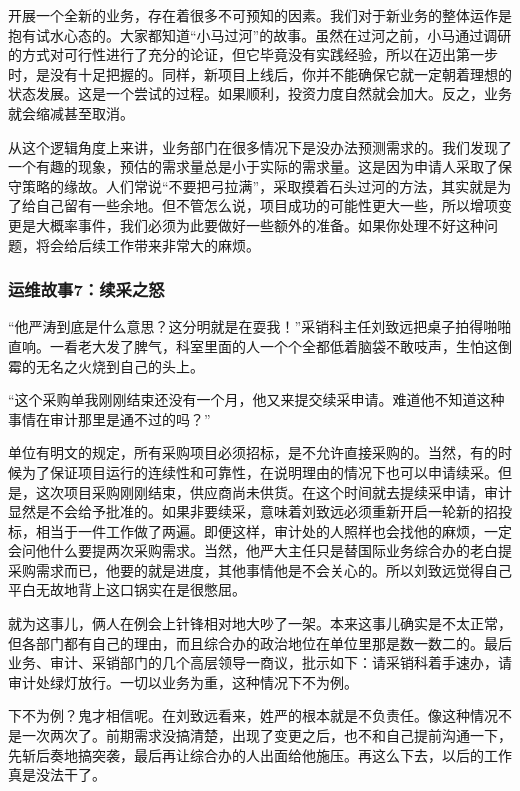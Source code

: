 \documentclass[12pt,UTF8]{ctexbook}
\begin{document}
开展一个全新的业务，存在着很多不可预知的因素。我们对于新业务的整体运作是抱有试水心态的。大家都知道“小马过河”的故事。虽然在过河之前，小马通过调研的方式对可行性进行了充分的论证，但它毕竟没有实践经验，所以在迈出第一步时，是没有十足把握的。同样，新项目上线后，你并不能确保它就一定朝着理想的状态发展。这是一个尝试的过程。如果顺利，投资力度自然就会加大。反之，业务就会缩减甚至取消。

从这个逻辑角度上来讲，业务部门在很多情况下是没办法预测需求的。我们发现了一个有趣的现象，预估的需求量总是小于实际的需求量。这是因为申请人采取了保守策略的缘故。人们常说“不要把弓拉满”，采取摸着石头过河的方法，其实就是为了给自己留有一些余地。但不管怎么说，项目成功的可能性更大一些，所以增项变更是大概率事件，我们必须为此要做好一些额外的准备。如果你处理不好这种问题，将会给后续工作带来非常大的麻烦。

\subsubsection{运维故事7：续采之怒}

“他严涛到底是什么意思？这分明就是在耍我！”采销科主任刘致远把桌子拍得啪啪直响。一看老大发了脾气，科室里面的人一个个全都低着脑袋不敢吱声，生怕这倒霉的无名之火烧到自己的头上。

“这个采购单我刚刚结束还没有一个月，他又来提交续采申请。难道他不知道这种事情在审计那里是通不过的吗？”

单位有明文的规定，所有采购项目必须招标，是不允许直接采购的。当然，有的时候为了保证项目运行的连续性和可靠性，在说明理由的情况下也可以申请续采。但是，这次项目采购刚刚结束，供应商尚未供货。在这个时间就去提续采申请，审计显然是不会给予批准的。如果非要续采，意味着刘致远必须重新开启一轮新的招投标，相当于一件工作做了两遍。即便这样，审计处的人照样也会找他的麻烦，一定会问他什么要提两次采购需求。当然，他严大主任只是替国际业务综合办的老白提采购需求而已，他要的就是进度，其他事情他是不会关心的。所以刘致远觉得自己平白无故地背上这口锅实在是很憋屈。

就为这事儿，俩人在例会上针锋相对地大吵了一架。本来这事儿确实是不太正常，但各部门都有自己的理由，而且综合办的政治地位在单位里那是数一数二的。最后业务、审计、采销部门的几个高层领导一商议，批示如下：请采销科着手速办，请审计处绿灯放行。一切以业务为重，这种情况下不为例。

下不为例？鬼才相信呢。在刘致远看来，姓严的根本就是不负责任。像这种情况不是一次两次了。前期需求没搞清楚，出现了变更之后，也不和自己提前沟通一下，先斩后奏地搞突袭，最后再让综合办的人出面给他施压。再这么下去，以后的工作真是没法干了。
\end{document}
